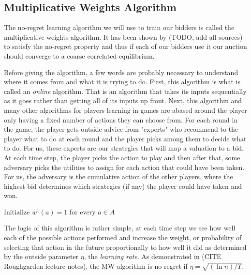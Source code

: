 \documentclass[12pt,twoside]{reedthesis}
\begin{document}
\subsection{Multiplicative Weights Algorithm}
The no-regret learning algorithm we will use to train our bidders is called the multiplicative weights algorithm. It has been shown by (TODO, add all sources) to satisfy the no-regret property and thus if each of our bidders use it our auction should converge to a coarse correlated equilibrium. 

Before giving the algorithm, a few words are probably necessary to understand where it comes from and what it is trying to do. First, this algorithm is what is called an \textit{online} algorithm. That is an algorithm that takes its inputs sequentially as it goes rather than getting all of its inputs up front. Next, this algorithm and many other algorithms for players learning in games are abased around the player only having a fixed number of actions they can choose from. For each round in the game, the player gets outside advice from "experts" who recommend to the player what to do at each round and the player picks among them to decide what to do. For us, these experts are our strategies that will map a valuation to a bid. At each time step, the player picks the action to play and then after that, some adversary picks the utilities to assign for each action that could have been taken. For us, the adversary is the cumulative action of the other players, where the highest bid determines which strategies (if any) the player could have taken and won.\\

\begin{algorithm}[H]
	Initialize $w^1(a) = 1$ for every $a\in A$\\
\end{algorithm}
\vspace{1cm}
The logic of this algorithm is rather simple, at each time step we see how well each of the possible actions performed and increase the weight, or probability of selecting that action in the future proportionally to how well it did as determined by the outside parameter $\eta$, the \textit{learning rate}. As demonstrated in (CITE Roughgarden lecture notes), the MW algorithm is no-regret if $\eta = \sqrt{(\ln n) / T}$.
\end{document}
